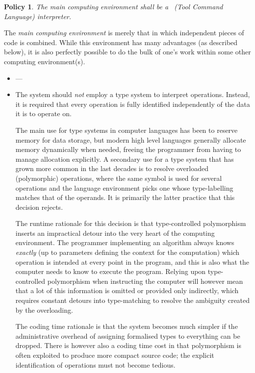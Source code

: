 \documentclass{mtmtcl}
\theoremstyle{plain}
\newtheorem{policy}{Policy}
\theoremstyle{remark}
\begin{document}
\begin{policy}
  The main computing environment shall be a \Tcl~(Tool Command 
  Language) interpreter.
\end{policy}

The \emph{main computing environment} is merely that in which 
independent pieces of code is combined. While this environment has 
many advantages (as described below), it is also perfectly possible 
to do the bulk of one's work within some other computing 
environment(s).


    
\begin{itemize}
    
  \item
    
    
    
    
    ---
    
    
    
  \item
    The system should \emph{not} employ a type system to interpret 
    operations. Instead, it is required that every operation is fully 
    identified independently of the data it is to operate on.
    
    The main use for type systems in computer languages has been to 
    reserve memory for data storage, but modern high level languages 
    generally allocate memory dynamically when needed, freeing the 
    programmer from having to manage allocation explicitly. 
    A secondary use for a type system that has grown more common in 
    the last decades is to resolve overloaded (polymorphic) 
    operations, where the same symbol is used for several operations 
    and the language environment picks one whose type-labelling 
    matches that of the operands. It is primarily the latter practice 
    that this decision rejects.
    
    The runtime rationale for this decision is that type-controlled 
    polymorphism inserts an impractical detour into the very heart of 
    the computing environment. The programmer implementing an 
    algorithm always knows \emph{exactly} (up to parameters defining 
    the context for the computation) which operation is intended at 
    every point in the program, and this is also what the computer 
    needs to know to execute the program. 
    Relying upon type-controlled polymorphism when instructing the 
    computer will however mean that a lot of this information is 
    omitted or provided only indirectly, which requires constant 
    detours into type-matching to resolve the ambiguity created by 
    the overloading.
    
    The coding time rationale is that the system becomes much simpler 
    if the administrative overhead of assigning formalised types to 
    everything can be dropped. There is however also a coding time 
    cost in that polymorphism is often exploited to produce more 
    compact source code; the explicit identification of operations 
    must not become tedious.
\end{itemize}
\end{document}
